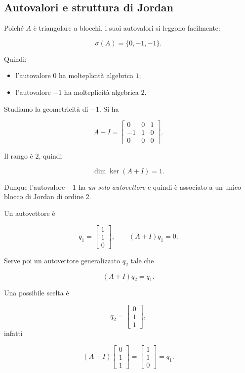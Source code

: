 \subsection{Autovalori e struttura di Jordan}

Poiché \(A\) è triangolare a blocchi, i suoi autovalori si leggono facilmente:

\[
\sigma(A)=\{0,-1,-1\}.
\]

Quindi:
\begin{itemize}
    \item l'autovalore \(0\) ha molteplicità algebrica \(1\);
    \item l'autovalore \(-1\) ha molteplicità algebrica \(2\).
\end{itemize}

Studiamo la geometricità di \(-1\). Si ha

\[
A+I=
\begin{bmatrix}
0 & 0 & 1\\
-1 & 1 & 0\\
0 & 0 & 0
\end{bmatrix}.
\]

Il rango è \(2\), quindi

\[
\dim\ker(A+I)=1.
\]

Dunque l'autovalore \(-1\) ha \emph{un solo autovettore} e quindi è associato a un unico blocco di Jordan di ordine \(2\).

Un autovettore è

\[
q_1=
\begin{bmatrix}
1\\1\\0
\end{bmatrix},
\qquad
(A+I)q_1=0.
\]

Serve poi un autovettore generalizzato \(q_2\) tale che

\[
(A+I)q_2=q_1.
\]

Una possibile scelta è

\[
q_2=
\begin{bmatrix}
0\\1\\1
\end{bmatrix},
\]
infatti

\[
(A+I)
\begin{bmatrix}
0\\1\\1
\end{bmatrix}
=
\begin{bmatrix}
1\\1\\0
\end{bmatrix}
=q_1.
\]


